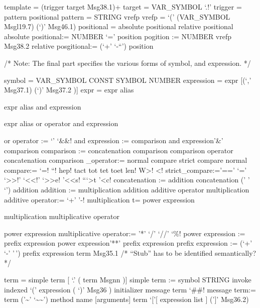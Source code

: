 template = (trigger \textbar{} target \textbar{} Msg38.1)+ target =
VAR\_SYMBOL \textbar{} `.!' trigger = pattern \textbar{} positional
pattern = STRING \textbar{} vrefp vrefp = `(' (VAR\_SYMBOL \textbar{}
Msgl19.7) (`)' \textbar{} Msg46.1) positional = absolute positional
\textbar{} relative positional absolute positional:= NUMBER `=' position
pogition := NUMBER \textbar{} vrefp \textbar{} Msg38.2 relative
posgitional:= (`+' \textbar{} `-``') position

/* Note: The final part specifies the various forms of symbol, and
expression. */

symbol = VAR\_SYMBOL \textbar{} CONST SYMBOL \textbar{} NUMBER
expression = expr {[}(`,' Msg37.1) \textbar{} (`)' Msg37.2 ){]} expr =
expr alias

expr alias and expression

expr alias or operator and expression

or operator := `\textbar{}' \textbar{} `\&\&! and expression :=
comparison \textbar{} and expression'\&' comparison comparison :=
concatenation \textbar{} comparison comparison operator concatenation
comparison \_operator:= normal compare \textbar{} strict compare normal
compare:= `=! \textbar{} ``\s! \textbar{} hep! \textbar{} tact
\textbar{} tot \textbar{} tet \textbar{} toet len! W\textgreater!
\textless! strict\_compare:='==' \textbar{} `\s=' \textbar{}
`\textgreater\textgreater!' \textbar{} `\textless\textless!' \textbar{}
`\textgreater\textgreater e! \textbar{}'\textless\textless s! \textbar{}
```\e\textgreater t \textbar{}'\textless c! concatenation := addition
\textbar{} concatenation (' ' \textbar{} `\textbar\textbar{}') addition
addition := multiplication \textbar{} addition additive operator
multiplication additive operator:= `+' \textbar{} '-! multiplication t=
power expression

multiplication multiplicative operator

power expression multiplicative operator:= '*' \textbar{} `/' \textbar{}
`//' \textbar{} `\%! power expression := prefix expression \textbar{}
power expression'**' prefix expression prefix expression := (`+'
\textbar{} `-' \textbar{} '\,') prefix expression term \textbar{}
Msg35.1 /* ``Stub'' has to be identified semantically? */

term = simple term {[} `.' ( term \textbar{} Msgnn ){]} simple term :=
symbol \textbar{} STRING \textbar{} invoke \textbar{} indexed `('
expression ( `)' \textbar{} Msg36 ) initializer \textbar{} message term
`\#\#! message term:= term ('\textasciitilde' \textbar{}
`\textasciitilde\textasciitilde{}') method name {[}arguments{]} term
`{[}'{[} expression list {]} ('{]}' \textbar{} Msg36.2)

